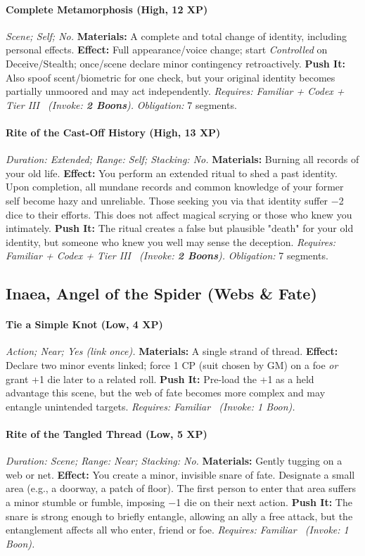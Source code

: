 \documentclass[12pt,twoside]{book}
\begin{document}
\paragraph{Complete Metamorphosis (High, 12 XP)} \emph{Scene; Self; No.}
\textbf{Materials:} A complete and total change of identity, including personal effects.
\textbf{Effect:} Full appearance/voice change; start \emph{Controlled} on Deceive/Stealth; once/scene declare minor contingency retroactively.
\textbf{Push It:} Also spoof scent/biometric for one check, but your original identity becomes partially unmoored and may act independently.
\emph{Requires: Familiar + Codex + Tier III \ (\textit{Invoke:} \textbf{2 Boons}).}
\emph{Obligation:} 7 segments.

\paragraph{Rite of the Cast-Off History (High, 13 XP)} \emph{Duration: Extended; Range: Self; Stacking: No.}
\textbf{Materials:} Burning all records of your old life.
\textbf{Effect:} You perform an extended ritual to shed a past identity. Upon completion, all mundane records and common knowledge of your former self become hazy and unreliable. Those seeking you via that identity suffer −2 dice to their efforts. This does not affect magical scrying or those who knew you intimately.
\textbf{Push It:} The ritual creates a false but plausible "death" for your old identity, but someone who knew you well may sense the deception.
\emph{Requires: Familiar + Codex + Tier III \ (\textit{Invoke:} \textbf{2 Boons}).}
\emph{Obligation:} 7 segments.

\subsection{Inaea, Angel of the Spider (Webs \& Fate)}
\paragraph{Tie a Simple Knot (Low, 4 XP)} \emph{Action; Near; Yes (link once).}
\textbf{Materials:} A single strand of thread.
\textbf{Effect:} Declare two minor events linked; force 1 CP (suit chosen by GM) on a foe \emph{or} grant +1 die later to a related roll.
\textbf{Push It:} Pre-load the +1 as a held advantage this scene, but the web of fate becomes more complex and may entangle unintended targets.
\emph{Requires: Familiar \ (\textit{Invoke:} 1 Boon).}
\paragraph{Rite of the Tangled Thread (Low, 5 XP)} \emph{Duration: Scene; Range: Near; Stacking: No.}
\textbf{Materials:} Gently tugging on a web or net.
\textbf{Effect:} You create a minor, invisible snare of fate. Designate a small area (e.g., a doorway, a patch of floor). The first person to enter that area suffers a minor stumble or fumble, imposing −1 die on their next action.
\textbf{Push It:} The snare is strong enough to briefly entangle, allowing an ally a free attack, but the entanglement affects all who enter, friend or foe.
\emph{Requires: Familiar \ (\textit{Invoke:} 1 Boon).}
\end{document}
